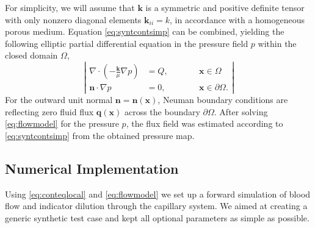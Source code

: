 \documentclass[journal,twocolumn]{IEEEtran}
\newcommand{\vq}{\mathbf{q}}
\newcommand{\vx}{\mathbf{x}}
\begin{document}
	For simplicity, we will assume that $\mathbf{k}$ is a symmetric and positive definite tensor with only nonzero diagonal elements $\mathbf{k}_{ii} = k$, in accordance with a homogeneous porous medium.	
	Equation \eqref{eq:syntcontsimp} can be combined, yielding the following elliptic partial differential equation in the pressure field $p$ within the closed domain $\Omega$,
	\begin{equation}
		\left\vert
		\begin{alignedat}{2}
			\nabla \cdot \left( -\frac{\mathbf{k}}{\mu} \nabla p \right) &= Q,  \qquad &&\vx \in \Omega \\
			\mathbf{n} \cdot \nabla p &=0, &&\vx \in \partial \Omega.
		\end{alignedat}
		\right\vert 
		\label{eq:flowmodel}
	\end{equation}
	For the outward unit normal $\mathbf{n}=\mathbf{n}(\vx)$, Neuman boundary conditions are reflecting zero fluid flux $\vq(\vx)$ across the boundary $\partial \Omega$.
	After solving \eqref{eq:flowmodel} for the pressure $p$, the flux field was estimated according to \eqref{eq:syntcontsimp} from the obtained pressure map. 

	

	
	
		
	\subsection{Numerical Implementation}\label{sec:NumExp}
	Using \eqref{eq:conteqlocal} and \eqref{eq:flowmodel} we set up a forward simulation of blood flow and indicator dilution through the capillary system.
	We aimed at creating a generic synthetic test case and kept all optional parameters as simple as possible. 
\end{document}
